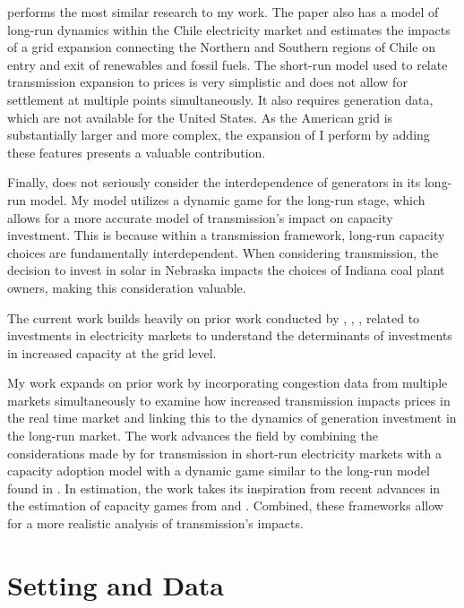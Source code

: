 \documentclass[12pt]{article}
\begin{document}
\cite{gonzales2022dynamic} performs the most similar research to my work. The paper also has a model of long-run dynamics within the Chile electricity market and estimates the impacts of a grid expansion connecting the Northern and Southern regions of Chile on entry and exit of renewables and fossil fuels. The short-run model used to relate transmission expansion to prices is very simplistic and does not allow for settlement at multiple points simultaneously. It also requires generation data, which are not available for the United States. As the American grid is substantially larger and more complex, the expansion of \cite{gonzales2022dynamic} I perform by adding these features presents a valuable contribution. 

Finally, \cite{gonzales2022dynamic} does not seriously consider the interdependence of generators in its long-run model. My model utilizes a dynamic game for the long-run stage, which allows for a more accurate model of transmission's impact on capacity investment. This is because within a transmission framework, long-run capacity choices are fundamentally interdependent. When considering transmission, the decision to invest in solar in Nebraska impacts the choices of Indiana coal plant owners, making this consideration valuable.

The current work builds heavily on prior work conducted by \cite{butters2021soaking}, \cite{elliott2022investment}, \cite{gonzales2022dynamic}, \cite{gowrisankaran2024energy} related to investments in electricity markets to understand the determinants of investments in increased capacity at the grid level. 

My work expands on prior work by incorporating congestion data from multiple markets simultaneously to examine how increased transmission impacts prices in the real time market and linking this to the dynamics of generation investment in the long-run market. The work advances the field by combining the considerations made by \cite{gonzales2022dynamic} for transmission in short-run electricity markets with a capacity adoption model with a dynamic game similar to the long-run model found in \cite{elliott2022investment}. In estimation, the work takes its inspiration from recent advances in the estimation of capacity games from \cite{gowrisankaran2024computable} and \cite{gowrisankaran2024computable}. Combined, these frameworks allow for a more realistic analysis of transmission's impacts.


\section{Setting and Data} \label{sec:data}
\end{document}
